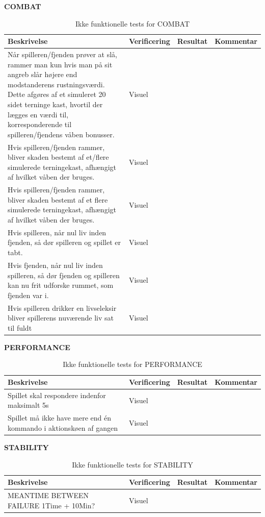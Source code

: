 \textbf{COMBAT}\\
\begin{table}[H]
\caption{ Ikke funktionelle tests for COMBAT}
\label{tab:}
\begin{tabular}{|p{3cm}|p{3cm}|p{3cm}|p{3cm}|}
\hline
Beskrivelse & Verificering & Resultat & Kommentar \\
\hline
Når spilleren/fjenden prøver at slå, rammer man kun hvis man på sit angreb slår højere end modstanderens rustningsværdi. Dette afgøres af et simuleret 20 sidet terninge kast, hvortil der lægges en værdi til, korresponderende til spilleren/fjendens våben bonusser. & Visuel & & \\
\hline
Hvis spilleren/fjenden rammer, bliver skaden bestemt af et/flere simulerede terningekast, afhængigt af hvilket våben der bruges. & Visuel & &\\
\hline
Hvis spilleren/fjenden rammer, bliver skaden bestemt af et flere simulerede terningekast, afhængigt af hvilket våben der bruges.  & Visuel & & \\
\hline
Hvis spilleren, når nul liv inden fjenden, så dør spilleren og spillet er tabt. & Visuel & & \\
\hline
Hvis fjenden, når nul liv inden spilleren, så dør fjenden og spilleren kan nu frit udforske rummet, som fjenden var i. & Visuel & & \\
\hline
Hvis spilleren drikker en livseleksir bliver spillerens nuværende liv sat til fuldt & Visuel & & \\
\hline
\end{tabular}
\end{table}

\textbf{PERFORMANCE}\\
\begin{table}[H]
\caption{ Ikke funktionelle tests for PERFORMANCE}
\label{tab:}
\begin{tabular}{|p{3cm}|p{3cm}|p{3cm}|p{3cm}|}
\hline
Beskrivelse & Verificering & Resultat & Kommentar \\
\hline
 Spillet skal respondere indenfor maksimalt 5s & Visuel & & \\
\hline
 Spillet må ikke have mere end én kommando i aktionskøen af gangen & Visuel & &\\
\hline
\end{tabular}
\end{table}

\textbf{STABILITY}\\
\begin{table}[H]
\caption{ Ikke funktionelle tests for STABILITY}
\label{tab:}
\begin{tabular}{|p{3cm}|p{3cm}|p{3cm}|p{3cm}|}
\hline
Beskrivelse & Verificering & Resultat & Kommentar \\
\hline
 MEANTIME BETWEEN FAILURE 1Time + 10Min? & Visuel & & \\
\hline
\end{tabular}
\end{table}

